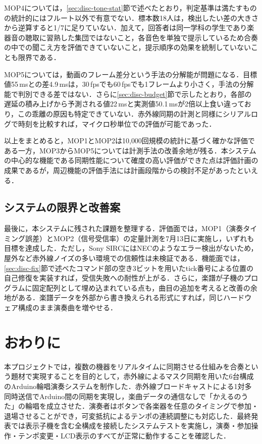 \documentclass[uplatex,dvipdfmx]{jlreq}
\begin{document}
MOP4については，\ref{sec:disc-tone-stat}節で述べたとおり，判定基準は満たすものの統計的にはフルート以外で有意でない．標本数18人は，検出したい差の大きさから逆算すると1/7に足りていない．加えて，回答者は同一学科の学生であり楽器音の聴取に習熟した集団ではないこと，各音色を単独で提示しているため合奏の中での聞こえ方を評価できていないこと，提示順序の効果を統制していないことも限界である．

MOP5については，動画のフレーム差分という手法の分解能が問題になる．目標値55\,msとの差4.9\,msは，30\,fpsでも60\,fpsでも1フレームより小さく，手法の分解能で判別できる差ではない．さらに\ref{sec:disc-budget}節で示したとおり，各部の遅延の積み上げから予測される値22\,msと実測値50.1\,msが2倍以上食い違っており，この乖離の原因も特定できていない．赤外線同期の計測と同様にシリアルログで時刻を比較すれば，マイクロ秒単位での評価が可能であった．

以上をまとめると，MOP1とMOP2は10{,}000回規模の統計に基づく確かな評価である一方，MOP3からMOP5については計測手法の改善余地が残る．本システムの中心的な機能である同期性能について確度の高い評価ができた点は評価計画の成果であるが，周辺機能の評価手法には計画段階からの検討不足があったといえる．

\subsection{システムの限界と改善案}
\label{sec:disc-limit}

最後に，本システムに残された課題を整理する．評価面では，MOP1（演奏タイミング誤差）とMOP2（信号受信率）の定量計測を7月13日に実施し，いずれも目標を達成した．ただし，Sony SIRCにはNECのようなエラー検出がないため，屋外など赤外線ノイズの多い環境での信頼性は未検証である．機能面では，\ref{sec:disc-fix}節で述べたコマンド部の空き3ビットを用いたtick番号による位置の自己修復を実装すれば，受信失敗への耐性が上がる．さらに，楽譜が子機のプログラムに固定配列として埋め込まれている点も，曲目の追加を考えると改善の余地がある．楽譜データを外部から書き換えられる形式にすれば，同じハードウェア構成のまま演奏曲を増やせる．

\section{おわりに}

本プロジェクトでは，複数の機器をリアルタイムに同期させる仕組みを合奏という題材で実現することを目的として，赤外線によるマスク同期を用いた6台構成のArduino輪唱演奏システムを制作した．赤外線ブロードキャストによる1対多同時送信でArduino間の同期を実現し，楽曲データの通信なしで「かえるのうた」の輪唱を成立させた．演奏者はボタンで各楽器を任意のタイミングで参加・退場させることができ，可変抵抗によるテンポの連続調整にも対応した．最終発表では表示子機を含む全構成を接続したシステムテストを実施し，演奏・参加操作・テンポ変更・LCD表示のすべてが正常に動作することを確認した．
\end{document}
